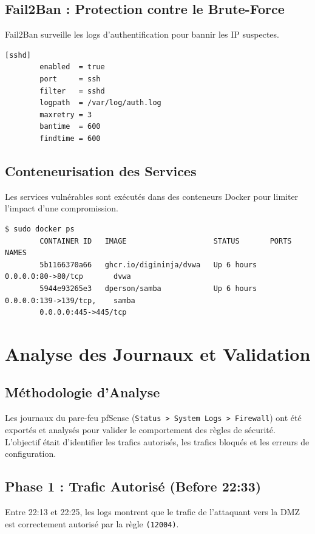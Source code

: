 \documentclass[12pt,a4paper,openany]{report}
\begin{document}
	\section{Fail2Ban : Protection contre le Brute-Force}
	Fail2Ban surveille les logs d'authentification pour bannir les IP suspectes.
	
	\begin{lstlisting}[caption=Configuration Fail2Ban (jail.local)]
		[sshd]
		enabled  = true
		port     = ssh
		filter   = sshd
		logpath  = /var/log/auth.log
		maxretry = 3
		bantime  = 600
		findtime = 600
	\end{lstlisting}
	
	\section{Conteneurisation des Services}
	Les services vulnérables sont exécutés dans des conteneurs Docker pour limiter l'impact d'une compromission.
	
	\begin{lstlisting}[caption=Conteneurs Actifs sur Ubuntu DMZ]
		$ sudo docker ps
		CONTAINER ID   IMAGE                    STATUS       PORTS                    NAMES
		5b1166370a66   ghcr.io/digininja/dvwa   Up 6 hours   0.0.0.0:80->80/tcp       dvwa
		5944e93265e3   dperson/samba            Up 6 hours   0.0.0.0:139->139/tcp,    samba
		0.0.0.0:445->445/tcp
	\end{lstlisting}
	
	\chapter{Analyse des Journaux et Validation}
	
	\section{Méthodologie d'Analyse}
	Les journaux du pare-feu pfSense (\texttt{Status > System Logs > Firewall}) ont été exportés et analysés pour valider le comportement des règles de sécurité. L'objectif était d'identifier les trafics autorisés, les trafics bloqués et les erreurs de configuration.
	
	\section{Phase 1 : Trafic Autorisé (Before 22:33)}
	Entre 22:13 et 22:25, les logs montrent que le trafic de l'attaquant vers la DMZ est correctement autorisé par la règle \texttt{(12004)}.
	
\end{document}
